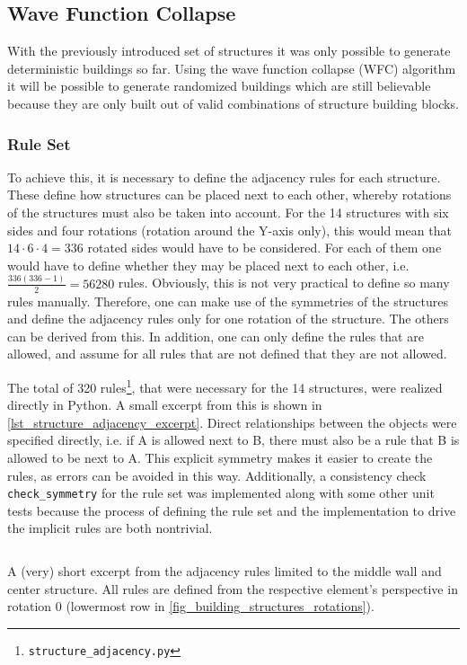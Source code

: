 \documentclass[
oneside,
fontsize=11pt
]{scrartcl}
\begin{document}
\subsection{Wave Function Collapse}
With the previously introduced set of structures it was only possible to generate deterministic
buildings so far. 
Using the wave function collapse (WFC) algorithm it will be possible to generate 
randomized buildings which are still believable 
because they are only built out of valid combinations of structure building blocks. 

\subsubsection{Rule Set}
To achieve this, it is necessary to define the adjacency rules for each structure. 
These define how structures can be placed next to each other, 
whereby rotations of the structures must also be taken into account. 
For the 14 structures with six sides and four rotations (rotation around the Y-axis only), 
this would mean that $14 \cdot 6 \cdot 4 = 336$ rotated sides would have to be considered. 
For each of them one would have to define whether they may be placed next to each other, 
i.e. $\frac{336 (336-1)}{2} = 56280$ rules. 
Obviously, this is not very practical to define so many rules manually. 
Therefore, one can make use of the symmetries of the structures 
and define the adjacency rules only for one rotation of the structure. 
The others can be derived from this. 
In addition, one can only define the rules that are allowed, 
and assume for all rules that are not defined that they are not allowed. 

The total of 320 rules\footnote{\texttt{structure\_adjacency.py}},
that were necessary for the 14 structures, were realized directly in Python. 
A small excerpt from this is shown in \autoref{lst_structure_adjacency_excerpt}. 
Direct relationships between the objects were specified directly, 
i.e. if A is allowed next to B, there must also be a rule that B is allowed to be next to A. 
This explicit symmetry makes it easier to create the rules, 
as errors can be avoided in this way. 
Additionally, a consistency check \texttt{check\_symmetry}
for the rule set was implemented along with some other unit tests
because the process of defining the rule set and 
the implementation to drive the implicit rules are both nontrivial.


\begin{listing}[ht]
  \inputminted[baselinestretch=0.55,linenos,breaklines]{python}{listings/structure_adjacency_excerpt.py}
  \caption{A (very) short excerpt from the adjacency rules limited to the middle wall and center structure.
    All rules are defined from the respective element's perspective in rotation 0 
    (lowermost row in \autoref{fig_building_structures_rotations}).
  }    
  \label{lst_structure_adjacency_excerpt}
\end{listing}
\end{document}
